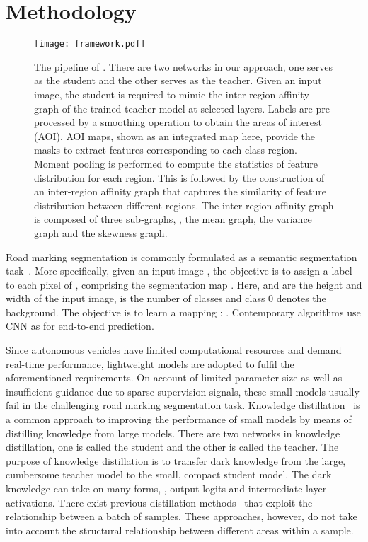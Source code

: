 \documentclass[10pt,twocolumn,letterpaper]{article}
\begin{document}
 
\section{Methodology}
\label{sec:methodology}


\begin{figure*}[t]
  \centering
  \texttt{[image: framework.pdf]}
  \caption{The pipeline of \algorithmname. There are two networks in our approach, one serves as the student and the other serves as the teacher. Given an input image, the student is required to mimic the inter-region affinity graph of the trained teacher model at selected layers. Labels are pre-processed by a smoothing operation to obtain the areas of interest (AOI). AOI maps, shown as an integrated map here, provide the masks to extract features corresponding to each class region. Moment pooling is performed to compute the statistics of feature distribution for each region. This is followed by the construction of an inter-region affinity graph that captures the similarity of feature distribution between different regions. The inter-region affinity graph is composed of three sub-graphs, \ie, the mean graph, the variance graph and the skewness graph.}
  \centering 
  \vskip -0.4cm
  \label{fig:pipeline}
\end{figure*}

Road marking segmentation is commonly formulated as a semantic segmentation task~\cite{wang2019apolloscape}. More specifically, given an input image , the objective is to assign a label  to each pixel  of , comprising the segmentation map . Here,  and  are the height and width of the input image,  is the number of classes and class 0 denotes the background. The objective is to learn a mapping : . Contemporary algorithms use CNN as  for end-to-end prediction. 

Since autonomous vehicles have limited computational resources and demand real-time performance, lightweight models are adopted to fulfil the aforementioned requirements. On account of limited parameter size as well as insufficient guidance due to sparse supervision signals, these small models usually fail in the challenging road marking segmentation task. Knowledge distillation~\cite{hinton2015distilling, hou2019learning, liu2019structured} is a common approach to improving the performance of small models by means of distilling knowledge from large models.  There are two networks in knowledge distillation, one is called the student and the other is called the teacher. The purpose of knowledge distillation is to transfer dark knowledge from the large, cumbersome teacher model to the small, compact student model. The dark knowledge can take on many forms, \eg, output logits and intermediate layer activations. 
There exist previous distillation methods~\cite{park2019relational, peng2019correlation, tung2019similarity} that exploit the relationship between a batch of samples. These approaches, however, do not take into account the structural relationship between different areas within a sample.
\end{document}

